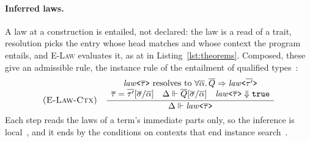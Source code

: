 \paragraph{Inferred laws.}
\label{app:fjlt:inferred}
A law at a construction is entailed, not declared: the law is a read of a trait, resolution picks the entry whose head matches and whose context the program entails, and \textsc{E-Law} evaluates it, as  at  in Listing~\ref{lst:theorems}.
Composed, these give an admissible rule, the instance rule of the entailment of qualified types~\cite{jones1994qualified}:
\[
\textsc{(E-Law-Ctx)}\quad \dfrac{\begin{array}{c} \mathit{law}\texttt{<}\overline{\tau}\texttt{>} \text{ resolves to } \forall\overline{\alpha}.\,\overline{Q} \Rightarrow \mathit{law}\texttt{<}\overline{\tau'}\texttt{>} \\ \overline{\tau} = \overline{\tau'}[\overline{\sigma}/\overline{\alpha}] \quad \Delta \Vdash \overline{Q}[\overline{\sigma}/\overline{\alpha}] \quad \mathit{law}\texttt{<}\overline{\tau}\texttt{>} \Downarrow \texttt{true} \end{array}}{\Delta \Vdash \mathit{law}\texttt{<}\overline{\tau}\texttt{>}}
\]
Each step reads the laws of a term's immediate parts only, so the inference is local~\cite{pierce2000local}, and it ends by the conditions on contexts that end instance search~\cite{sulzmann2007understanding}.


